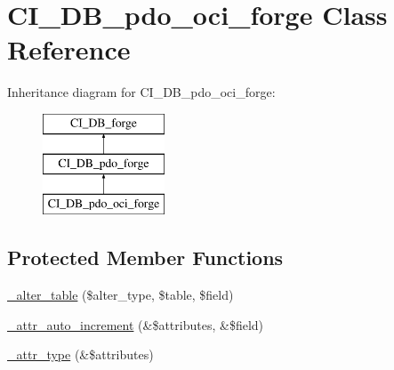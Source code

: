 \hypertarget{class_c_i___d_b__pdo__oci__forge}{}\section{C\+I\+\_\+\+D\+B\+\_\+pdo\+\_\+oci\+\_\+forge Class Reference}
\label{class_c_i___d_b__pdo__oci__forge}
Inheritance diagram for C\+I\+\_\+\+D\+B\+\_\+pdo\+\_\+oci\+\_\+forge\+:\begin{figure}[H]
\begin{center}
\leavevmode
\includegraphics[height=3.000000cm]{class_c_i___d_b__pdo__oci__forge}
\end{center}
\end{figure}
\subsection*{Protected Member Functions}
\begin{DoxyCompactItemize}
\item 
\mbox{\hyperlink{class_c_i___d_b__pdo__oci__forge_ad4f3a1c5f262126d12974997bd219e2a}{\+\_\+alter\+\_\+table}} (\$alter\+\_\+type, \$table, \$field)
\item 
\mbox{\hyperlink{class_c_i___d_b__pdo__oci__forge_adce52cd619b3ab15608adfeac5e0e485}{\+\_\+attr\+\_\+auto\+\_\+increment}} (\&\$attributes, \&\$field)
\item 
\mbox{\hyperlink{class_c_i___d_b__pdo__oci__forge_a3ad4a9d8e9573fc9cf87d658f9583c3c}{\+\_\+attr\+\_\+type}} (\&\$attributes)
\end{DoxyCompactItemize}
